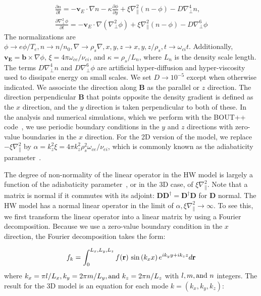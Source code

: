 \documentclass[letter,scriptaddress,twocolumn, prl,showkeys]{revtex4}
\def\beq{\begin{equation}}
\def\eeq{\end{equation}}
\def\beqar{\begin{eqnarray}}
\def\eeqar{\end{eqnarray}}
\newcommand{\pdiff}[2]{\frac{\partial#1}{\partial#2}}
\def\grad{\nabla}
\newcommand{\gradpar}{\grad_\parallel}
\newcommand{\gradperp}{\grad_\perp}
\begin{document}
\beqar
\label{n_eq}
\pdiff{n}{t} = - {\mathbf v_E} \cdot \grad n - \kappa \pdiff{\phi}{y} + \xi \gradpar^2 (n - \phi) - D \gradperp^4 n, \\
\label{phi_eq}
\pdiff{\gradperp^2 \phi}{t} = - {\mathbf v_E} \cdot \grad (\gradperp^2 \phi) + \xi \gradpar^2 (n - \phi) - D \gradperp^6 \phi
\eeqar
The normalizations are $\phi \to e \phi/T_e, n \to n/n_0, \grad \to \rho_s \grad , x,y,z \to x,y,z/\rho_s, t \to \omega_{ci} t $. Additionally,
$\mathbf{v_E} = \mathbf{b} \times \grad \phi$, $\xi = 4 \pi \omega_{ce}/\nu_{ei}$, 
and $\kappa = \rho_s/L_n$, where $L_n$ is the density scale length. The terms $D \gradperp^4 n$ and $D \gradperp^6 \phi$ are artificial hyper-diffusion and hyper-viscosity used to dissipate
energy on small scales. We set $D \to 10^{-5}$ except when otherwise indicated.
We associate the direction along $\mathbf{B}$ as the parallel or $z$ direction. The direction perpendicular $\mathbf{B}$ that
points opposite the density gradient is defined as the $x$ direction, and the $y$ direction is taken perpendicular to both of these. 
In the analysis and numerical simulations, which we perform with the BOUT++ code~\cite{dudson2009}, we use periodic boundary conditions in
the $y$ and $z$ directions with zero-value boundaries in the $x$ direction. For the 2D version of the model, we replace $-\xi \gradpar^2$ by 
$\alpha = k_z^2 \xi = 4 \pi k_z^2 \rho_s^2 \omega_{ce} /\nu_{ei}$, which is commonly known as the adiabaticity parameter~\cite{camargo1995,camargo1998}.

The degree of non-normality of the linear operator in the HW model is largely a function of the adiabaticity parameter~\cite{camargo1998}, or in the 3D case, of $\xi \gradpar^2$. 
Note that a matrix is normal if it commutes with its adjoint: $\mathbf{D} \mathbf{D}^\dagger = \mathbf{D}^\dagger \mathbf{D}$ for $\mathbf{D}$ normal. 
The HW model has a normal linear operator in the limit of $\alpha, \xi \gradpar^2 \to \infty$. 
To see this, we first transform the linear operator into a linear matrix by using a Fourier decomposition. Because we use a zero-value boundary condition in the $x$ direction, the
Fourier decomposition takes the form:

\beq
\label{fourier_form}
f_k = \int_0^{L_x,L_y,L_z} f(\mathbf{r}) \ {\rm sin} \left( k_x x \right) e^{i k_y y + i k_z z} d\mathbf{r}
\eeq
where $k_x = \pi l/L_x, k_y = 2 \pi m/L_y, {\rm and } \ k_z = 2 \pi n/L_z$ with $l, m, {\rm and } \ n$ integers.
The result for the 3D model is an equation for each mode $k = (k_x,k_y,k_z)$:
\end{document}

